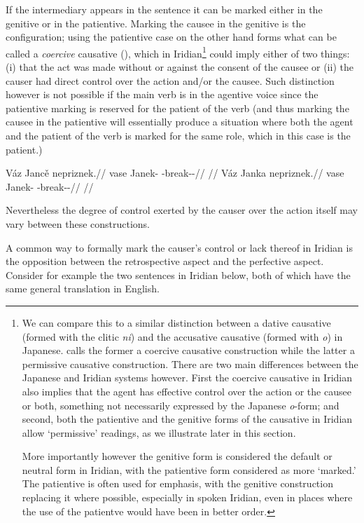 If the intermediary appears in the sentence it can be marked either in the
genitive or in the patientive. Marking the causee in the genitive is the
 configuration; using the patientive case on the other hand forms
what can be called a \emph{coercive} causative
(\cite{shibatani1990,lehmann2006}), which in Iridian\footnote{We can compare
this to a similar distinction between a dative causative (formed with the clitic
\emph{ni}) and the accusative causative (formed with \emph{o}) in
Japanese. \textcite{lehmann2006} calls the former a coercive
causative construction while the latter a permissive causative construction.
There are two main differences between the Japanese and Iridian
systems however. First the coercive causative in Iridian also implies that the
agent has effective control over the action or the causee or both, something not
necessarily expressed by the Japanese \emph{o}-form; and second,
both the patientive and the genitive forms of the causative in Iridian allow
`permissive' readings, as we illustrate later in this section.

More importantly however the genitive form is considered the default or neutral
form in Iridian, with the patientive form considered as more `marked.' The
patientive is often used for emphasis, with the genitive construction replacing
it where possible, especially in spoken Iridian, even in places where the use of
the patientve would have been in better order. } could imply either of two
things: (i) that the act was made without or against the consent of the causee
or (ii) the causer had direct control over the action and/or the causee. Such
distinction however is not possible if the main verb is in the agentive voice
since the patientive marking is reserved for the patient of the verb (and thus
marking the causee in the patientive will essentially produce a situation where
both the agent and the patient of the verb is marked for the same role, which in
this case is the patient.)

\pex
\a
\begingl
\gla Váz Jancě nepriznek.//
\glb vase Janek-\Gen{} \Caus{}-break-\Pv{}-\Pf{}//
\glft {}//
\endgl
\a
\begingl
\gla Váz Janka nepriznek.//
\glb vase Janek-\Acc{} \Caus{}-break-\Pv{}-\Pf{}//
\glft {}//
\endgl
\xe


Nevertheless the degree of control exerted by the causer over the action itself
may vary between these constructions.

A common way to formally mark the causer's control or lack thereof in Iridian is
the opposition between the retrospective aspect and the perfective aspect.
Consider for example the two sentences in Iridian below, both of which have the
same general translation in English.

